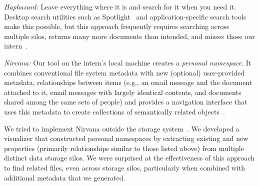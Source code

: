 
\textit{Haphazard:} Leave everything where it is and search for it when you need it. 
Desktop search utilities such as Spotlight~\cite{apple-search} and application-specific search tools make this possible, 
but this approach frequently requires searching across multiple silos, returns many more documents than intended, and misses those our intern~\cite{bergman2019factors}.

\textit{Nirvana:} Our tool on the intern's local machine creates a \textit{personal namespace}. 
It combines conventional file system metadata with new (optional) user-provided metadata, relationships between items (e.g., an email
message and the document attached to it, email messages with largely identical contents, and documents shared among the same sets of people)
and provides a navigation interface that uses this metadata to create collections of semantically related objects~\cite{gifford1991semantic}.

We tried to implement Nirvana outside the storage system~\cite{ashish}. 
We developed a visualizer that constructed personal namespaces by extracting existing and new properties (primarily relationships similar to those listed above) from multiple distinct data storage silos.  
We were surprised at the effectiveness of this approach to find related files, even across storage silos, particularly when combined with additional metadata that we generated. 


